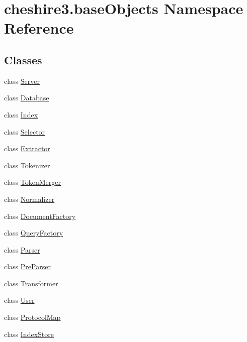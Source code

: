 \hypertarget{namespacecheshire3_1_1base_objects}{\section{cheshire3.\-base\-Objects Namespace Reference}
\label{namespacecheshire3_1_1base_objects}
}
\subsection*{Classes}
\begin{DoxyCompactItemize}
\item 
class \hyperlink{classcheshire3_1_1base_objects_1_1_server}{Server}
\item 
class \hyperlink{classcheshire3_1_1base_objects_1_1_database}{Database}
\item 
class \hyperlink{classcheshire3_1_1base_objects_1_1_index}{Index}
\item 
class \hyperlink{classcheshire3_1_1base_objects_1_1_selector}{Selector}
\item 
class \hyperlink{classcheshire3_1_1base_objects_1_1_extractor}{Extractor}
\item 
class \hyperlink{classcheshire3_1_1base_objects_1_1_tokenizer}{Tokenizer}
\item 
class \hyperlink{classcheshire3_1_1base_objects_1_1_token_merger}{Token\-Merger}
\item 
class \hyperlink{classcheshire3_1_1base_objects_1_1_normalizer}{Normalizer}
\item 
class \hyperlink{classcheshire3_1_1base_objects_1_1_document_factory}{Document\-Factory}
\item 
class \hyperlink{classcheshire3_1_1base_objects_1_1_query_factory}{Query\-Factory}
\item 
class \hyperlink{classcheshire3_1_1base_objects_1_1_parser}{Parser}
\item 
class \hyperlink{classcheshire3_1_1base_objects_1_1_pre_parser}{Pre\-Parser}
\item 
class \hyperlink{classcheshire3_1_1base_objects_1_1_transformer}{Transformer}
\item 
class \hyperlink{classcheshire3_1_1base_objects_1_1_user}{User}
\item 
class \hyperlink{classcheshire3_1_1base_objects_1_1_protocol_map}{Protocol\-Map}
\item 
class \hyperlink{classcheshire3_1_1base_objects_1_1_index_store}{Index\-Store}
\item 

\end{DoxyCompactItemize}
